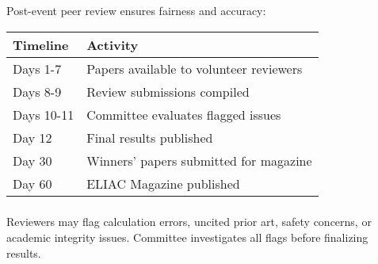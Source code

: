 \subsubsection{}
Post-event peer review ensures fairness and accuracy:

\begin{tabular}{ll}
\toprule
Timeline & Activity \\
\midrule
Days 1-7 & Papers available to volunteer reviewers \\
Days 8-9 & Review submissions compiled \\
Days 10-11 & Committee evaluates flagged issues \\
Day 12 & Final results published \\
Day 30 & Winners' papers submitted for magazine \\
Day 60 & ELIAC Magazine published \\
\bottomrule
\end{tabular}

\subsubsection{}
Reviewers may flag calculation errors, uncited prior art, safety concerns, or academic integrity issues. Committee investigates all flags before finalizing results.